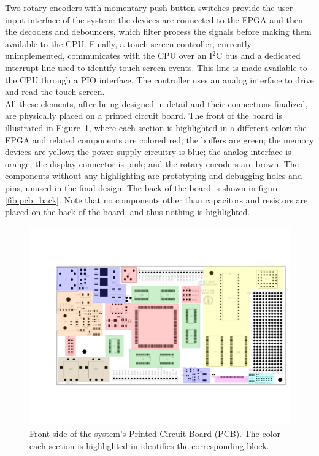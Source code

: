 \documentclass[titlepage]{scrartcl}
\begin{document}
	Two rotary encoders with momentary push-button switches provide the user-input interface of the system: the devices are connected to the FPGA and then the decoders and debouncers, which filter process the signals before making them available to the CPU. Finally, a touch screen controller, currently unimplemented, communicates with the CPU over an I$^2$C bus and a dedicated interrupt line used to identify touch screen events. This line is made available to the CPU through a PIO interface. The controller uses an analog interface to drive and read the touch screen.\\
	
	All these elements, after being designed in detail and their connections finalized, are physically placed on a printed circuit board. The front of the board is illustrated in Figure~\ref{fig:pcb}, where each section is highlighted in a different color: the FPGA and related components are colored red; the buffers are green; the memory devices are yellow; the power supply circuitry is blue; the analog interface is orange; the display connector is pink; and the rotary encoders are brown. The components without any highlighting are prototyping and debugging holes and pins, unused in the final design. The back of the board is shown in figure \ref{fib:pcb_back}. Note that no components other than capacitors and resistors are placed on the back of the board, and thus nothing is highlighted.\\

	\begin{figure}[h!]
	\vspace{-2cm}
	\centerline{\includegraphics[width=28cm, angle=90, origin=c]{img/pcb.pdf}}
		\vspace{-2cm}
                	\caption{Front side of the system's Printed Circuit Board (PCB). The color each section is highlighted in identifies the corresponding block.}
               	\label{fig:pcb}
	\end{figure}
\end{document}
